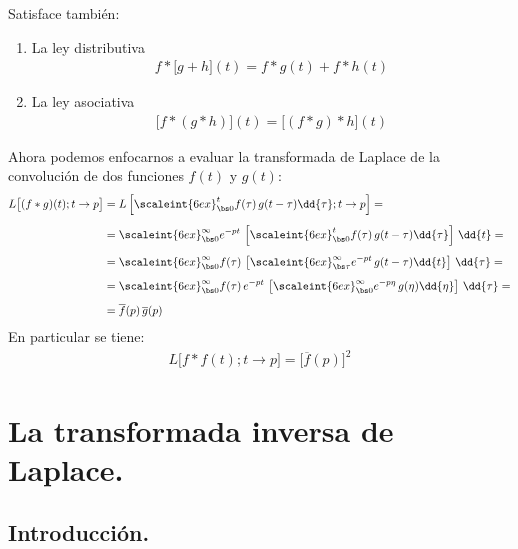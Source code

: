 Satisface también:
\begin{enumerate}
\item La ley distributiva
\begin{align}
f * \big[g + h\big](t) = f * g(t) + f * h(t)
\label{eq:ecuacion_03_57}
\end{align}
\item La ley asociativa
\begin{align}
\big[f * (g * h)\big](t) = \big[(f * g) * h\big](t)
\label{eq:ecuacion_03_58}
\end{align}
\end{enumerate}
Ahora podemos enfocarnos a evaluar la transformada de Laplace de la convolución de dos funciones $f(t)$ y $g(t)$:
\begin{align}
\begin{aligned}[b]
L \big[(f * g)(t); t \to p\big] &= L \left[ \scaleint{6ex}_{\bs 0}^{t} f(\tau) \, g(t - \tau) \dd{\tau}; t \to p \right] = \\[0.5em]
&= \scaleint{6ex}_{\bs 0}^{\infty} e^{-p t} \, \left[ \scaleint{6ex}_{\bs 0}^{t} f(\tau) \, g(t - \tau) \dd{\tau}\right] \, \dd{t} = \\[0.5em]
&= \scaleint{6ex}_{\bs 0}^{\infty} f(\tau) \, \left[ \scaleint{6ex}_{\bs \tau}^{\infty} e^{-p t} \, g(t - \tau) \dd{t}\right] \, \dd{\tau} = \\[0.5em]
&= \scaleint{6ex}_{\bs 0}^{\infty} f(\tau) \, e^{- p t} \, \left[ \scaleint{6ex}_{\bs 0}^{\infty} e^{-p \eta} \, g(\eta) \dd{\eta} \right] \, \dd{\tau} = \\[0.5em]
&= \overline{f}(p) \, \overline{g}(p)
\end{aligned}
\label{eq:ecuacion_03_59}
\end{align}
En particular se tiene:
\begin{align*}
L \big[f * f(t); t \to p\big] = \big[\overline{f}(p)\big]^{2}
\end{align*}

\section{La transformada inversa de Laplace.}

\subsection{Introducción.}

